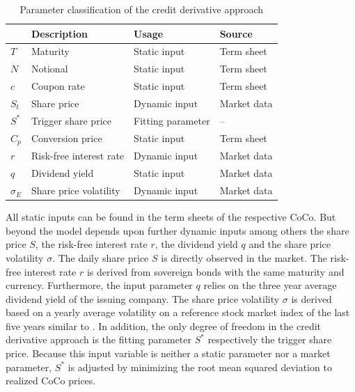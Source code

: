 \begin{table}[H]
	\setlength{\extrarowheight}{2.5pt}
	\centering
	\begin{tabular}{llll}
		\toprule
			 & \textbf{Description} & \textbf{Usage} & \textbf{Source} \\
		\midrule
			$T$ & Maturity & Static input & Term sheet \\
			$N$ & Notional & Static input & Term sheet \\			
			$c$ & Coupon rate & Static input & Term sheet \\
			$S_t$ & Share price & Dynamic input & Market data \\
			$S^*$ & Trigger share price & Fitting parameter & -- \\
			$C_p$ & Conversion price & Static input & Term sheet \\
			$r$ & Risk-free interest rate & Dynamic input & Market data \\
			$q$ & Dividend yield & Static input & Market data\\
			$\sigma_E$& Share price volatility & Dynamic input & Market data \\
		\bottomrule
	\end{tabular}
	\caption[Parameter classification of the credit derivative approach]{Parameter classification of the credit derivative approach \citep{wilkens2014contingent}}
	\label{creditparameters}
\end{table}

All static inputs can be found in the term sheets of the respective CoCo. But beyond the model depends upon further dynamic inputs among others the share price $S$, the risk-free interest rate $r$, the dividend yield $q$ and the share price volatility $\sigma$. The daily share price $S$ is directly observed in the market. The risk-free interest rate $r$ is derived from sovereign bonds with the same maturity and currency. Furthermore, the input parameter $q$ relies on the three year average dividend yield of the issuing company. The share price volatility $\sigma$ is derived based on a yearly average volatility on a reference stock market index of the last five years similar to \citet{alvemar2012modelling}. In addition, the only degree of freedom in the credit derivative approach is the fitting parameter $S^*$ respectively the trigger share price. Because this input variable is neither a static parameter nor a market parameter, $S^*$ is adjusted by minimizing the root mean squared deviation to realized CoCo prices. \citep{erismann2011analytical}

